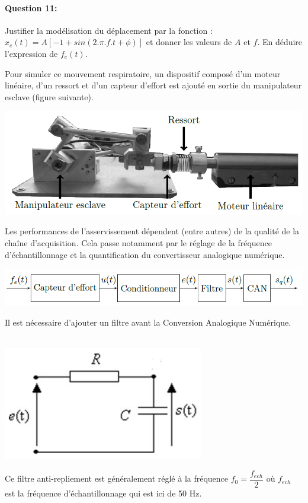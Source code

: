 \paragraph{Question 11:} Justifier la modélisation du déplacement par la fonction : $x_e(t)=A\left[-1+sin\left(2.\pi.f.t+\phi\right)\right]$ et donner les valeurs de $A$ et $f$. En déduire l'expression de $f_e(t)$.

Pour simuler ce mouvement respiratoire, un dispositif composé d'un moteur linéaire, d'un ressort et d'un capteur d'effort est ajouté en sortie du manipulateur esclave (figure suivante).

\begin{center}
 \includegraphics[width=0.7\linewidth]{img/Figure15}
\end{center}

Les performances de l'asservissement dépendent (entre autres) de la qualité de la chaîne d'acquisition. Cela passe notamment par le réglage de la fréquence d'échantillonnage et la quantification du convertisseur analogique numérique.

\begin{center}
 \includegraphics[width=0.7\linewidth]{img/Figure16}
\end{center}

Il est nécessaire d'ajouter un filtre avant la Conversion Analogique Numérique.
\\ ~\ \\
\begin{minipage}{0.35\linewidth}
 \includegraphics[width=0.9\linewidth]{img/Figure17}
\end{minipage}\hfill
\begin{minipage}{0.6\linewidth}
Ce filtre \og anti-repliement \fg est généralement réglé à la fréquence $f_0=\dfrac{f_{ech}}{2}$ où $f_{ech}$ est la fréquence d'échantillonnage qui est ici de 50 Hz.
\end{minipage}

